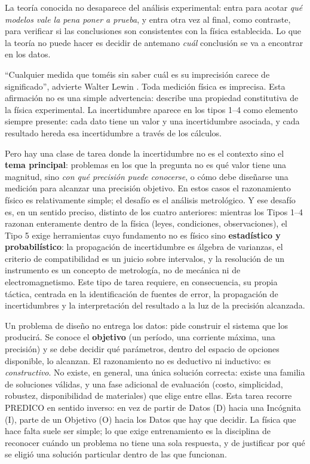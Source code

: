 \documentclass[11pt]{book}
\begin{document}
La teoría conocida no desaparece del análisis experimental: entra para acotar {\it qué modelos vale la pena poner a prueba}, y entra otra vez al final, como contraste, para verificar si las conclusiones son consistentes con la física establecida. Lo que la teoría no puede hacer es decidir de antemano {\it cuál} conclusión se va a encontrar en los datos.

\medskip
{}
``Cualquier medida que toméis sin saber cuál es su imprecisión carece de significado'', advierte Walter Lewin \cite{Lewin2011}. Toda medición física es imprecisa. Esta afirmación no es una simple advertencia: describe una propiedad constitutiva de la física experimental. La incertidumbre aparece en los tipos 1--4 como elemento siempre presente: cada dato tiene un valor y una incertidumbre asociada, y cada resultado hereda esa incertidumbre a través de los cálculos.

Pero hay una clase de tarea donde la incertidumbre no es el contexto sino el {\bf tema principal}: problemas en los que la pregunta no es qué valor tiene una magnitud, sino {\it con qué precisión puede conocerse}, o cómo debe diseñarse una medición para alcanzar una precisión objetivo. En estos casos el razonamiento físico es relativamente simple; el desafío es el análisis metrológico. Y ese desafío es, en un sentido preciso, distinto de los cuatro anteriores: mientras los Tipos 1--4 razonan enteramente dentro de la física (leyes, condiciones, observaciones), el Tipo 5 exige herramientas cuyo fundamento no es físico sino {\bf estadístico y probabilístico}: la propagación de incertidumbre es álgebra de varianzas, el criterio de compatibilidad es un juicio sobre intervalos, y la resolución de un instrumento es un concepto de metrología, no de mecánica ni de electromagnetismo. Este tipo de tarea requiere, en consecuencia, su propia táctica, centrada en la identificación de fuentes de error, la propagación de incertidumbres y la interpretación del resultado a la luz de la precisión alcanzada.

\medskip
{}
Un problema de diseño no entrega los datos: pide construir el sistema que los producirá. Se conoce el {\bf objetivo} (un período, una corriente máxima, una precisión) y se debe decidir qué parámetros, dentro del espacio de opciones disponible, lo alcanzan. El razonamiento no es deductivo ni inductivo: es {\it constructivo}. No existe, en general, una única solución correcta: existe una familia de soluciones válidas, y una fase adicional de evaluación (costo, simplicidad, robustez, disponibilidad de materiales) que elige entre ellas. Esta tarea recorre PREDICO en sentido inverso: en vez de partir de Datos (D) hacia una Incógnita (I), parte de un Objetivo (O) hacia los Datos que hay que decidir. La física que hace falta suele ser simple; lo que exige entrenamiento es la disciplina de reconocer cuándo un problema no tiene una sola respuesta, y de justificar por qué se eligió una solución particular dentro de las que funcionan.
\end{document}
